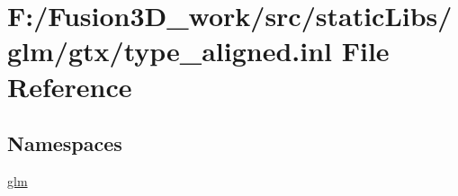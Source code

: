 \hypertarget{type__aligned_8inl}{}\section{F\+:/\+Fusion3\+D\+\_\+work/src/static\+Libs/glm/gtx/type\+\_\+aligned.inl File Reference}
\label{type__aligned_8inl}
\subsection*{Namespaces}
\begin{DoxyCompactItemize}
\item 
 \hyperlink{namespaceglm}{glm}
\end{DoxyCompactItemize}

